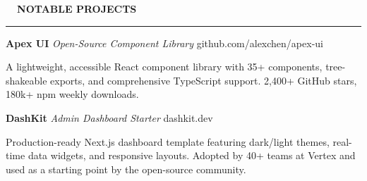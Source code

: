 \documentclass[11pt,a4paper]{article}
\begin{document}
\vspace{10pt}

{\large\bfseries\color{primary}\faRocket\ \ NOTABLE PROJECTS}\par
\vspace{2pt}
{\color{accent}\rule{\textwidth}{1.2pt}}\par
\vspace{8pt}

{\bfseries Apex UI} \textbar{} {\itshape Open-Source Component Library} \hfill {\color{secondary}github.com/alexchen/apex-ui}
\par
A lightweight, accessible React component library with 35+ components, tree-shakeable exports, and comprehensive TypeScript support. 2,400+ GitHub stars, 180k+ npm weekly downloads.

\vspace{8pt}

{\bfseries DashKit} \textbar{} {\itshape Admin Dashboard Starter} \hfill {\color{secondary}dashkit.dev}
\par
Production-ready Next.js dashboard template featuring dark/light themes, real-time data widgets, and responsive layouts. Adopted by 40+ teams at Vertex and used as a starting point by the open-source community.
\end{document}
